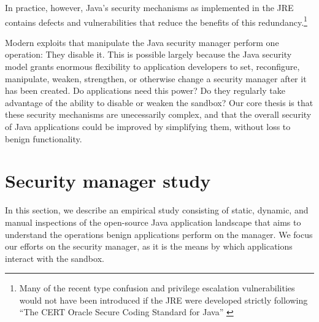 \documentclass{sig-alternate}
\begin{document}
In practice, however, Java's security mechanisms as implemented
in the JRE contains defects and vulnerabilities that reduce the benefits of
this redundancy.\footnote{Many of the recent type confusion and privilege escalation vulnerabilities
would not have been introduced if the JRE were developed strictly
following ``The CERT Oracle Secure Coding Standard for Java'' \cite{long_cert_2011,svoboda_anatomy_blog_2013,svoboda_anatomy_2014}}
  
Modern exploits that manipulate the Java security manager perform one
operation: They disable it.  This is possible largely because the Java security model
grants enormous flexibility to application developers to
set, reconfigure, manipulate, weaken, strengthen, or otherwise change a security
manager after it has been created.
Do applications need this power?  Do they regularly take advantage of the
ability to disable or weaken the sandbox? %
Our core thesis is that these security mechanisms are unecessarily
complex, and that the overall security of Java applications could be improved by
simplifying them, without loss to benign functionality.

\section{Security manager study}\label{sec:Security-Manager-Study}

In this section, we describe an empirical study consisting of static,
dynamic, and manual inspections of the open-source Java application landscape
that aims to understand the operations benign applications perform on the
manager. We focus our efforts on the security manager, as it is the
means by which applications interact with the sandbox.
\end{document}
